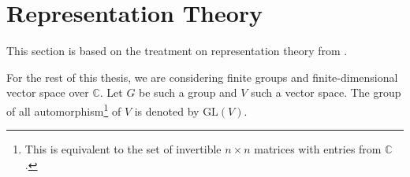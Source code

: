 \documentclass[12pt, a4paper, twoside]{article}
\newcommand{\C}{\mathbb{C}}
\newcommand{\GL}{\text{GL}}
\newcommand{\1}{\mathbf{1}}
\theoremstyle{definition}
\theoremstyle{plain}
\theoremstyle{remark}
\begin{document}
	
%



%	
%

\clearpage{\thispagestyle{empty}}%
{\hypersetup{linkcolor=black}
	\tableofcontents
}

\clearpage{\thispagestyle{empty}}
\section{Representation Theory}

	This section is based on the treatment on representation theory from \cite{FultonHarris}.
	
	For the rest of this thesis, we are considering finite groups and finite-dimensional vector space over $\C$. Let $G$ be such a group and $V$ such a vector space. The group of all automorphism\footnote{This is equivalent to the set of invertible $n \times n$ matrices with entries from $\C$.} of $V$ is denoted by $\GL(V)$.
		
\end{document}
